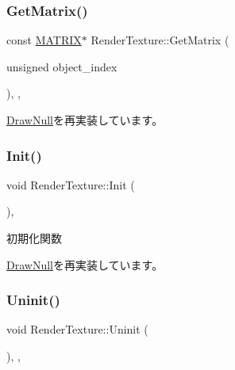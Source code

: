 \subsubsection{\texorpdfstring{Get\+Matrix()}{GetMatrix()}}
{\footnotesize\ttfamily const \mbox{\hyperlink{_vector3_d_8h_a032295cd9fb1b711757c90667278e744}{M\+A\+T\+R\+IX}}$\ast$ Render\+Texture\+::\+Get\+Matrix (\begin{DoxyParamCaption}\item[{unsigned}]{object\+\_\+index }\end{DoxyParamCaption})\hspace{0.3cm}{\ttfamily [inline]}, {\ttfamily [override]}, {\ttfamily [virtual]}}



\mbox{\hyperlink{class_draw_null_adede079e9c11a756090740b20bb43022}{Draw\+Null}}を再実装しています。

\mbox{\label{class_render_texture_a498eb8be8672e01164b3770cdff43291}} 
\subsubsection{\texorpdfstring{Init()}{Init()}}
{\footnotesize\ttfamily void Render\+Texture\+::\+Init (\begin{DoxyParamCaption}{ }\end{DoxyParamCaption})\hspace{0.3cm}{\ttfamily [inline]}, {\ttfamily [virtual]}}



初期化関数 



\mbox{\hyperlink{class_draw_null_acd7fef3ccea1da537ac9507ffbb6dd2e}{Draw\+Null}}を再実装しています。

\mbox{\label{class_render_texture_a0e55cd9b412d87dfe1f4b90f29f357c8}} 
\subsubsection{\texorpdfstring{Uninit()}{Uninit()}}
{\footnotesize\ttfamily void Render\+Texture\+::\+Uninit (\begin{DoxyParamCaption}{ }\end{DoxyParamCaption})\hspace{0.3cm}{\ttfamily [inline]}, {\ttfamily [override]}, {\ttfamily [virtual]}}



